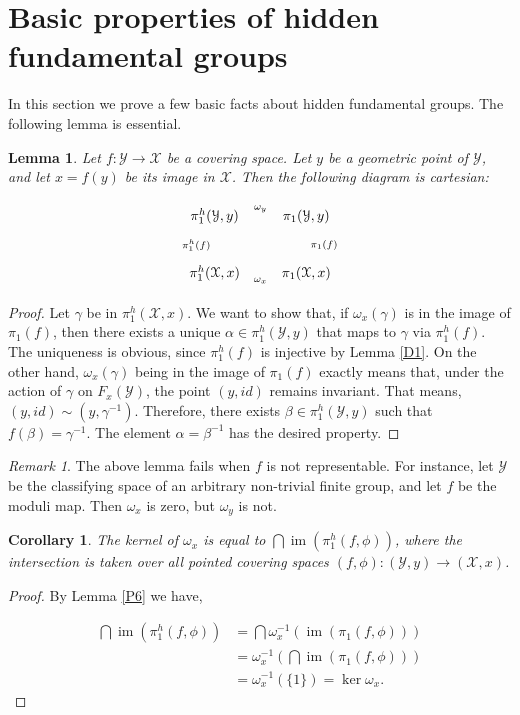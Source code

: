 \documentclass{amsart}
\newtheorem{cor}[thm]{Corollary}
\newtheorem{lem}[thm]{Lemma}
\theoremstyle{definition}
\theoremstyle{remark}
\newtheorem{rem}[thm]{Remark}
\theoremstyle{remark}
\newcommand{\X}{\mathcal{X}}
\newcommand{\Y}{\mathcal{Y}}
\newcommand{\pX}{\pi_1(\X,x)}
\newcommand{\phX}{\pi_1^{h}(\X,x)}
\newcommand{\pY}{\pi_1(\Y,y)}
\newcommand{\phY}{\pi_1^{h}(\Y,y)}
\let\:=\colon
\newcommand{\Ker}{\operatorname{ker}}
\newcommand{\im}{\operatorname{im}}
\begin{document}
\section{Basic properties of hidden fundamental groups}{\label{S:basic}}

In this section we prove a few basic facts about hidden
fundamental groups. The following lemma is essential.

\begin{lem}{\label{P6}}
Let $f \: \Y \to \X$ be a covering  space. Let $y$ be a geometric
point of $\Y$, and let $x=f(y)$ be its image in $\X$. Then the
following diagram is cartesian:

$$\xymatrix{ \phY \ar[r]^{\omega_y} \ar[d]_{\pi_1^{h}(f)} & \pY
\ar[d]^{\pi_1(f)}\\
             \phX \ar[r]_{\omega_x} & \pX } $$
\end{lem}

\begin{proof}
Let $\gamma$ be in $\phX$. We want to show that, if
$\omega_x(\gamma)$ is in the image of $\pi_1(f)$, then there
exists a unique $\alpha \in \phY$ that maps to $\gamma$ via
$\pi_1^{h}(f)$. The uniqueness is obvious, since $\pi_1^{h}(f)$ is
injective by Lemma \ref{D1}. On the other hand, $\omega_x(\gamma)$
being in the image of $\pi_1(f)$ exactly means that, under the
action of $\gamma$ on $F_x(\Y)$, the point $(y, id)$ remains
invariant. That means, $(y,id) \sim (y, \gamma^{-1})$. Therefore,
there exists $\beta \in \phY$ such that $f(\beta)=\gamma^{-1}$.
The element $\alpha = \beta^{-1}$ has the desired property.
\end{proof}

\begin{rem}
The above lemma fails when $f$ is not representable. For instance,
let $\Y$ be the classifying space of an arbitrary non-trivial
finite group, and let $f$ be the moduli map. Then $\omega_x$ is
zero, but $\omega_y$ is not.
\end{rem}

\begin{cor}{\label{P5}}
The kernel of $\omega_x$ is equal to $\bigcap \im(\pi_1^{h}(f,
\phi))$, where the intersection is taken over all pointed covering
spaces $(f, \phi) \: (\Y,y) \to (\X,x)$.
\end{cor}

\begin{proof}
By Lemma \ref{P6} we have,

\begin{align*}
\bigcap \im(\pi_1^{h}(f, \phi)) &=\bigcap
\omega_x^{-1}(\im(\pi_1(f, \phi))) \\ &= \omega_x^{-1}(\bigcap
\im(\pi_1(f, \phi))) \\ &=\omega_x^{-1}(\{1\})=\Ker \omega_x.
\end{align*}
\end{proof}
\end{document}
